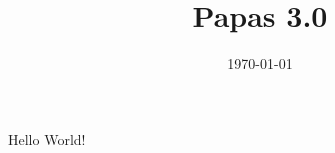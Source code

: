 \documentclass[a4paper]{article}
\title{Papas 3.0}
\date{\today}
\begin{document}
    \maketitle
    \tableofcontents
    \paragraph{}
    Hello World!
\end{document}

